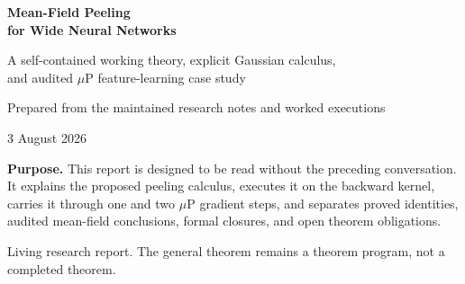 \documentclass[11pt,oneside,a4paper]{article}
\begin{document}
\hypersetup{pageanchor=false}

\begin{titlepage}
\centering
\vspace*{1.2cm}
{\Huge\bfseries\color{PeelBlue} Mean-Field Peeling\\[0.25cm]
for Wide Neural Networks\par}
\vspace{0.7cm}
{\Large A self-contained working theory, explicit Gaussian calculus,\\
and audited \(\mu\)P feature-learning case study\par}
\vspace{1.4cm}
{\large Prepared from the maintained research notes and worked executions\par}
\vspace{0.35cm}
{\large 3 August 2026\par}
\vfill
\begin{minipage}{0.84\textwidth}
\color{PeelGray}
\textbf{Purpose.}
This report is designed to be read without the preceding conversation.
It explains the proposed peeling calculus, executes it on the backward
kernel, carries it through one and two \(\mu\)P gradient steps, and separates
proved identities, audited mean-field conclusions, formal closures, and open
theorem obligations.
\end{minipage}
\vfill
{\small Living research report. The general theorem remains a theorem program,
not a completed theorem.}
\end{titlepage}

\hypersetup{pageanchor=true}
\tableofcontents
\clearpage
{}


\end{document}
